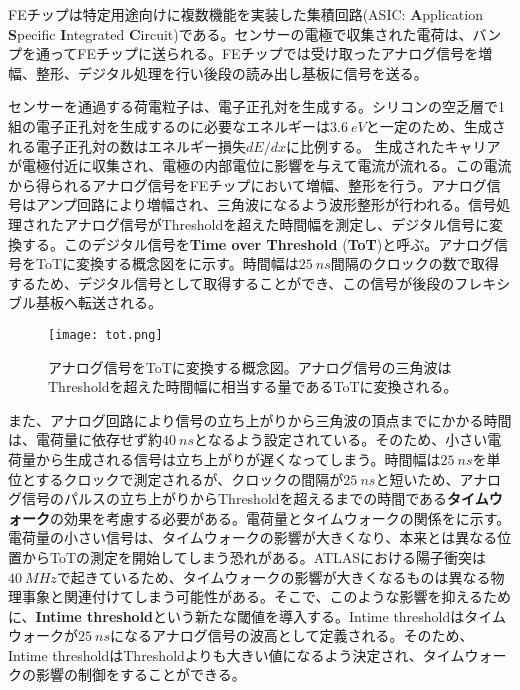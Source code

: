 FEチップは特定用途向けに複数機能を実装した集積回路(ASIC: \textbf{A}pplication \textbf{S}pecific \textbf{I}ntegrated \textbf{C}ircuit)である。センサーの電極で収集された電荷は、バンプを通ってFEチップに送られる。FEチップでは受け取ったアナログ信号を増幅、整形、デジタル処理を行い後段の読み出し基板に信号を送る。

センサーを通過する荷電粒子は、電子正孔対を生成する。シリコンの空乏層で1組の電子正孔対を生成するのに必要なエネルギーは$3.6\ \si{eV}$と一定のため、生成される電子正孔対の数はエネルギー損失$dE/dx$に比例する。
生成されたキャリアが電極付近に収集され、電極の内部電位に影響を与えて電流が流れる。この電流から得られるアナログ信号をFEチップにおいて増幅、整形を行う。アナログ信号はアンプ回路により増幅され、三角波になるよう波形整形が行われる。信号処理されたアナログ信号がThresholdを超えた時間幅を測定し、デジタル信号に変換する。このデジタル信号を\textbf{Time over Threshold} (\textbf{ToT})と呼ぶ。アナログ信号をToTに変換する概念図をに示す。時間幅は$25\ \si{ns}$間隔のクロックの数で取得するため、デジタル信号として取得することができ、この信号が後段のフレキシブル基板へ転送される。

\begin{figure}[tbp]
  \centering
  \texttt{[image: tot.png]}
  \caption[アナログ信号をToTに変換する概念図]{アナログ信号をToTに変換する概念図。アナログ信号の三角波はThresholdを超えた時間幅に相当する量であるToTに変換される。}
  \label{fig:tot}
\end{figure}

また、アナログ回路により信号の立ち上がりから三角波の頂点までにかかる時間は、電荷量に依存せず約$40\ \si{ns}$となるよう設定されている。そのため、小さい電荷量から生成される信号は立ち上がりが遅くなってしまう。時間幅は$25\ \si{ns}$を単位とするクロックで測定されるが、クロックの間隔が$25\ \si{ns}$と短いため、アナログ信号のパルスの立ち上がりからThresholdを超えるまでの時間である\textbf{タイムウォーク}の効果を考慮する必要がある。電荷量とタイムウォークの関係をに示す。電荷量の小さい信号は、タイムウォークの影響が大きくなり、本来とは異なる位置からToTの測定を開始してしまう恐れがある。ATLASにおける陽子衝突は$40\ \si{MHz}$で起きているため、タイムウォークの影響が大きくなるものは異なる物理事象と関連付けてしまう可能性がある。そこで、このような影響を抑えるために、\textbf{Intime threshold}という新たな閾値を導入する。Intime thresholdはタイムウォークが$25\ \si{ns}$になるアナログ信号の波高として定義される。そのため、Intime thresholdはThresholdよりも大きい値になるよう決定され、タイムウォークの影響の制御をすることができる。

